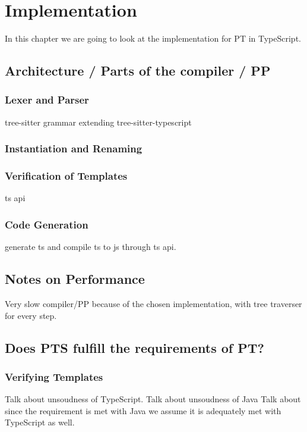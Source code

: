 
\chapter{Implementation}\label{ch:implementation}

In this chapter we are going to look at the implementation for PT in TypeScript.

\section{Architecture / Parts of the compiler / PP}\label{sec:architecture}



\subsection{Lexer and Parser}\label{sec:lexer-and-parser}

tree-sitter grammar extending tree-sitter-typescript

\subsection{Instantiation and Renaming}\label{sec:instantiation-and-renaming}


\subsection{Verification of Templates}\label{sec:verification-of-templates}

ts api

\subsection{Code Generation}\label{sec:code-generation}

generate ts and compile ts to js through ts api.

\section{Notes on Performance}

Very slow compiler/PP because of the chosen implementation, with tree traverser for every step.

\section{Does PTS fulfill the requirements of PT?}\label{sec:does-pts-fulfill-the-requirements-of-pt?}

\subsection{Verifying Templates}\label{subsec:pt-requirements-verifying-templates}

Talk about unsoudness of TypeScript.
Talk about unsoudness of Java \cite{java-unsound}
Talk about since the requirement is met with Java we assume it is adequately met with TypeScript as well.

